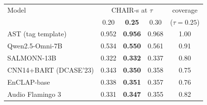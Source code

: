 \begin{tabular}{lccc|c}
\toprule
Model & \multicolumn{3}{c|}{CHAIR-s at $\tau$} & coverage \\
 & 0.20 & \textbf{0.25} & 0.30 & ($\tau{=}0.25$) \\
\midrule
AST (tag template) & 0.952 & \textbf{0.956} & 0.968 & 1.00 \\
Qwen2.5-Omni-7B & 0.534 & \textbf{0.550} & 0.561 & 0.91 \\
SALMONN-13B & 0.322 & \textbf{0.332} & 0.337 & 0.80 \\
CNN14+BART (DCASE'23) & 0.343 & \textbf{0.350} & 0.358 & 0.75 \\
EnCLAP-base & 0.338 & \textbf{0.351} & 0.357 & 0.76 \\
Audio Flamingo 3 & 0.331 & \textbf{0.347} & 0.355 & 0.82 \\
\bottomrule
\end{tabular}
